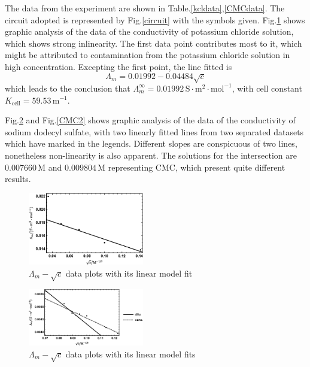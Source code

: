 \documentclass[%
 reprint,
 amsmath,amssymb,
 aps,
]{revtex4-1}
\begin{document}
The data from the experiment are shown in Table.\ref{kcldata},\ref{CMCdata}. The circuit adopted is represented by Fig.\ref{circuit} with the symbols given. Fig.\ref{KCL} shows graphic analysis of the data of the conductivity of potassium chloride solution, which shows strong inlinearity. The first data point contributes most to it, which might be attributed to contamination from the potassium chloride solution in high concentration. Excepting the first point, the line fitted is 
\begin{equation}
\Lambda_m = 0.01992- 0.04484\sqrt{c}
\end{equation}
which leads to the conclusion that $\Lambda_m^\infty = 0.01992 \, \mathrm{S\cdot m^2 \cdot mol^{-1}}$, with cell constant $K_\text{cell} = 59.53 \, \mathrm{m^{-1}}$.

Fig.\ref{CMC1} and Fig.\ref{CMC2} shows graphic analysis of the data of the conductivity of sodium dodecyl sulfate, with two linearly fitted lines from two separated datasets which have marked in the legends. Different slopes are conspicuous of two lines, nonetheless non-linearity is also apparent. The solutions for the intersection are $0.007660 \, \mathrm{M}$ and $0.009804 \, \mathrm{M}$ representing CMC, which present quite different results. 

\begin{figure}
\centering
\includegraphics[width=0.45\textwidth]{figures/kcl.eps}
\caption{$\Lambda_m -\sqrt{c}$ data plots with its linear model fit}
\label{KCL}
\end{figure}

\begin{figure}
\centering
\includegraphics[width=0.45\textwidth]{figures/CMC1.eps}
\caption{$\Lambda_m - \sqrt{c}$ data plots with its linear model fits}
\label{CMC1}
\end{figure}
\end{document}
